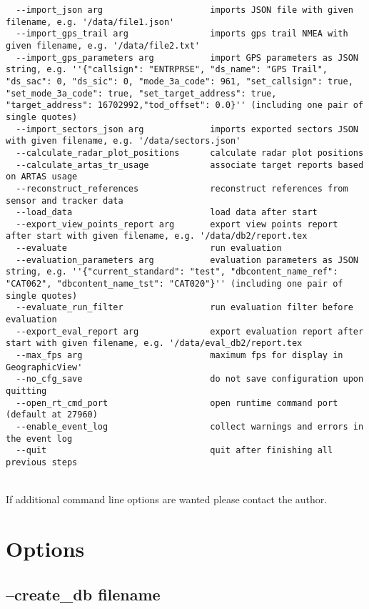 \begin{lstlisting}
  --import_json arg                     imports JSON file with given filename, e.g. '/data/file1.json'
  --import_gps_trail arg                imports gps trail NMEA with given filename, e.g. '/data/file2.txt'
  --import_gps_parameters arg           import GPS parameters as JSON string, e.g. ''{"callsign": "ENTRPRSE", "ds_name": "GPS Trail", "ds_sac": 0, "ds_sic": 0, "mode_3a_code": 961, "set_callsign": true, "set_mode_3a_code": true, "set_target_address": true, "target_address": 16702992,"tod_offset": 0.0}'' (including one pair of single quotes)
  --import_sectors_json arg             imports exported sectors JSON with given filename, e.g. '/data/sectors.json'
  --calculate_radar_plot_positions      calculate radar plot positions
  --calculate_artas_tr_usage            associate target reports based on ARTAS usage
  --reconstruct_references              reconstruct references from sensor and tracker data
  --load_data                           load data after start
  --export_view_points_report arg       export view points report after start with given filename, e.g. '/data/db2/report.tex
  --evaluate                            run evaluation
  --evaluation_parameters arg           evaluation parameters as JSON string, e.g. ''{"current_standard": "test", "dbcontent_name_ref": "CAT062", "dbcontent_name_tst": "CAT020"}'' (including one pair of single quotes)
  --evaluate_run_filter                 run evaluation filter before evaluation
  --export_eval_report arg              export evaluation report after start with given filename, e.g. '/data/eval_db2/report.tex
  --max_fps arg                         maximum fps for display in GeographicView'
  --no_cfg_save                         do not save configuration upon quitting
  --open_rt_cmd_port                    open runtime command port (default at 27960)
  --enable_event_log                    collect warnings and errors in the event log
  --quit                                quit after finishing all previous steps
\end{lstlisting}
\ \\

If additional command line options are wanted please contact the author.

\section{Options}

\subsection{--create\_db filename}

